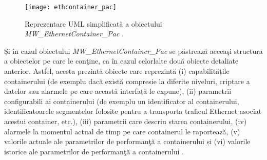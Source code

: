 \begin{figure}[h]
	\centering
	\texttt{[image: ethcontainer\_pac]}
	\caption{Reprezentare UML simplificată a obiectului \textit{MW\_EthernetContainer\_Pac} \cite{onftr532}.}
	\label{fig:ethcontainer_pac}
\end{figure}

Și în cazul obiectului \textit{MW\_EthernetContainer\_Pac} se păstrează aceeaşi structura a obiectelor pe care le conţine, ca în cazul celorlalte două obiecte detaliate anterior. Astfel, acesta prezintă obiecte care reprezintă (i) capabilitățile containerului (de exemplu dacă există compresie la diferite niveluri, criptare a datelor sau alarmele pe care această interfață le expune), (ii) parametrii configurabili ai containerului (de exemplu un identificator al containerului, identificatoarele segmentelor folosite pentru a transporta traficul Ethernet asociat acestui container, etc.), (iii) parametrii care descriu starea containerului, (iv) alarmele la momentul actual de timp pe care containerul le raportează, (v) valorile actuale ale parametrilor de performanţă a containerului și (vi) valorile istorice ale parametrilor de performanţă a containerului \cite{onftr532}.
